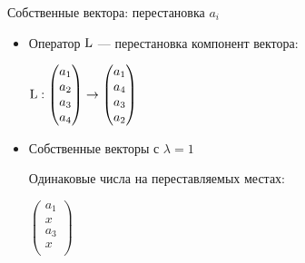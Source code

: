 \begin{frame}{Собственные вектора: перестановка $a_i$}

\begin{itemize}[<+->]
\item Оператор $\operatorname{L}$ — перестановка компонент вектора:

$\operatorname{L} : \begin{pmatrix}
    a_1 \\
    a_2 \\
    a_3\\
    a_4 \\
\end{pmatrix} \to 
\begin{pmatrix}
    a_1 \\
    a_4 \\
    a_3\\
    a_2 \\
\end{pmatrix}$

\item Собственные векторы с $\lambda = 1$

Одинаковые числа на переставляемых местах:

$\begin{pmatrix}
    a_1 \\
    x \\
    a_3 \\
    x \\
\end{pmatrix}$

\end{itemize}

\end{frame}



